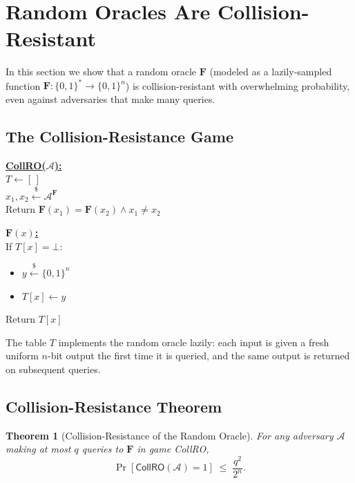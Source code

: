\documentclass[11pt]{article}
\theoremstyle{plain}
\newtheorem{theorem}{Theorem}[section]
\theoremstyle{definition}
\newcommand{\samplefrom}{\xleftarrow{\$}}
\newcommand{\Adv}{\mathcal{A}}
\newcommand{\RO}{\mathbf{F}}   %
\begin{document}
\section{Random Oracles Are Collision-Resistant}

In this section we show that a random oracle $\RO$ (modeled as a lazily-sampled
function $\RO : \{0,1\}^* \to \{0,1\}^n$) is collision-resistant with
overwhelming probability, even against adversaries that make many queries.

\subsection{The Collision-Resistance Game}

\begin{tcolorbox}[title={Game \textsf{CollRO}($\Adv$)}, colback=blue!5, colframe=blue!40!black]
\textbf{\underline{\textsf{CollRO}($\Adv$):}}\\
$T \leftarrow [\,]$\\
$x_1, x_2 \samplefrom \Adv^{\RO}$\\
Return $\RO(x_1) = \RO(x_2) \wedge x_1 \neq x_2$

\bigskip
\textbf{\underline{$\RO(x)$:}}\\
If $T[x] = \bot$:
\begin{itemize}[leftmargin=2em, topsep=2pt, itemsep=0pt]
  \item $y \samplefrom \{0,1\}^n$
  \item $T[x] \leftarrow y$
\end{itemize}
Return $T[x]$
\end{tcolorbox}

The table $T$ implements the random oracle lazily: each input is given a fresh
uniform $n$-bit output the first time it is queried, and the same output is
returned on subsequent queries.

\subsection{Collision-Resistance Theorem}

\begin{theorem}[Collision-Resistance of the Random Oracle]
\label{thm:collro}
For any adversary $\Adv$ making at most $q$ queries to $\RO$ in game
\textsf{CollRO},
\[
  \Pr[\textsf{CollRO}(\Adv) = 1] \;\le\; \frac{q^2}{2^n}.
\]
\end{theorem}
\end{document}

